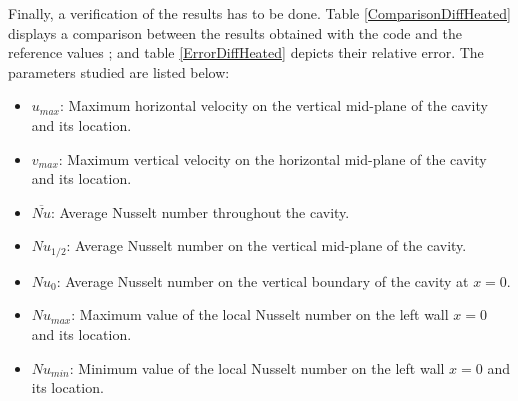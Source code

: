 Finally, a verification of the results has to be done. Table \ref{ComparisonDiffHeated} displays a comparison between the results obtained with the code and the reference values \cite{DeVahlDavis1983}; and table \ref{ErrorDiffHeated} depicts their relative error. The parameters studied are listed below:
\begin{itemize}
	\item $u_{max}$: Maximum horizontal velocity on the vertical mid-plane of the cavity and its location.
	\item $v_{max}$: Maximum vertical velocity on the horizontal mid-plane of the cavity and its location.
	\item $\overbar{Nu}$: Average Nusselt number throughout the cavity.
	\item $Nu_{1/2}$: Average Nusselt number on the vertical mid-plane of the cavity.
	\item $Nu_{0}$: Average Nusselt number on the vertical boundary of the cavity at $x=0$.
	\item $Nu_{max}$: Maximum value of the local Nusselt number on the left wall $x=0$ and its location.
	\item $Nu_{min}$: Minimum value of the local Nusselt number on the left wall $x=0$ and its location.
\end{itemize}
